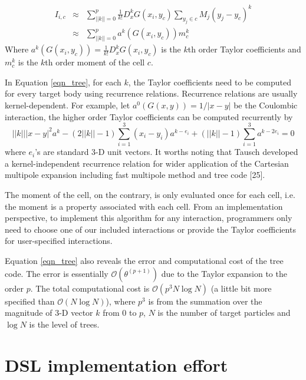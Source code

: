 \documentclass[11pt,a4paper]{article}
\begin{document}
\begin{enumerate}
{\begin{eqnarray}
\label{eqn_tree}
I_{i,c} &\approx& \sum\limits_{||k||=0}^{p} \frac{1}{k!}D^{k}_{x}G(x_i,y_c) \sum\limits_{y_j \in c}M_j{(y_j-y_c)}^k\\
\label{eqn_tree2}
&\approx& \sum\limits_{||k||=0}^{p} a^k(G(x_i, y_c))m^k_c
\end{eqnarray}
Where $a^k(G(x_i, y_c))=\frac{1}{k!}D^{k}_{x}G(x_i,y_c)$ is the $k$th order Taylor coefficients and $m^k_c
$ is the $k$th order moment of the cell $c$. 

In Equation \ref{eqn_tree}, for each $k$, the 
Taylor coefficients need to be computed for every target body using recurrence relations. Recurrence relations are usually kernel-dependent. For example, let $a^0(G(x, y))=1/|x-y|$ be the Coulombic interaction, the higher order Taylor coefficients can be computed recurrently by
\begin{equation}
||{k}|| |{ x}-{ y}|^2 a^{ k}-(2||{ k}||-1)
\sum_{i=1}^3 (x_i-y_i)a^{{ k}-{ e}_i}
+ (||{ k}||-1)\sum_{i=1}^3 a^{{ k}-2{ e}_i} = 0\nonumber 
\label{recurrence_1} 
\end{equation}
where $e_i$'s are standard 3-D unit vectors.  It worths noting that Tausch developed a kernel-independent recurrence relation for wider application of the Cartesian multipole expansion including fast multipole method and tree code [25].   


 
The moment of the cell, on the contrary, is only evaluated once for each cell, i.e. the moment is a property associated with each cell. 
From an implementation perspective, to 
implement this algorithm for any interaction, programmers only need to choose one of our included interactions or provide the Taylor coefficients for user-specified interactions. 

Equation \ref{eqn_tree} also reveals the error and computational cost of the tree code. The error is essentially $\mathcal{O}(\theta^{(p+1)})$ due to the Taylor expansion to the order $p$. The total computational cost is $\mathcal{O}(p^3N \log N)$ (a little bit more specified than $\mathcal{O}(N\log N)$), where $p^3$ is from the summation over the magnitude of 3-D vector $k$ from 0 to $p$, $N$ is the number of target particles and $\log N$ is the level of trees. 
 

}
\end{enumerate}


\section {DSL implementation effort}
\end{document}
